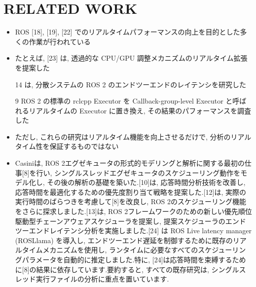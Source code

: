 
\section{RELATED WORK}
\label{sec: related work}


\begin{frame}{}
    \begin{itemize}
        \item ROS [18], [19], [22] でのリアルタイムパフォーマンスの向上を目的とした多くの作業が行われている
\item たとえば, [23] は, 透過的な CPU/GPU 調整メカニズムのリアルタイム拡張を提案した
\item [14] は, 分散システムの ROS 2 のエンドツーエンドのレイテンシを研究した
\item [9] ROS 2 の標準の rclcpp Executor を Callback-group-level Executor と呼ばれるリアルタイムの Executor に置き換え, その結果のパフォーマンスを調査した
\item ただし, これらの研究はリアルタイム機能を向上させるだけで, 分析のリアルタイム性を保証するものではない
    \end{itemize}
\end{frame}

\begin{frame}{}
    \begin{itemize}
        \item Casiniは, ROS 2エグゼキュータの形式的モデリングと解析に関する最初の仕事[8]を行い, シングルスレッドエグゼキュータのスケジューリング動作をモデル化し, その後の解析の基礎を築いた.[10]は, 応答時間分析技術を改善し, 応答時間を最適化するための優先度割り当て戦略を提案した.[12]は, 実際の実行時間のばらつきを考慮して[8]を改良し, ROS 2のスケジューリング機能をさらに探求しました.[13]は, ROS 2フレームワークのための新しい優先順位駆動型チェーンアウェアスケジューラを提案し, 提案スケジューラのエンドツーエンドレイテンシ分析を実施しました.[24] は ROS Live latency manager (ROSLlama) を導入し, エンドツーエンド遅延を制御するために既存のリアルタイムメカニズムを使用し, ランタイムに必要なすべてのスケジューリングパラメータを自動的に推定しました.特に, [24]は応答時間を束縛するために[8]の結果に依存しています.要約すると, すべての既存研究は, シングルスレッド実行ファイルの分析に重点を置いています.
    \end{itemize}
\end{frame}

